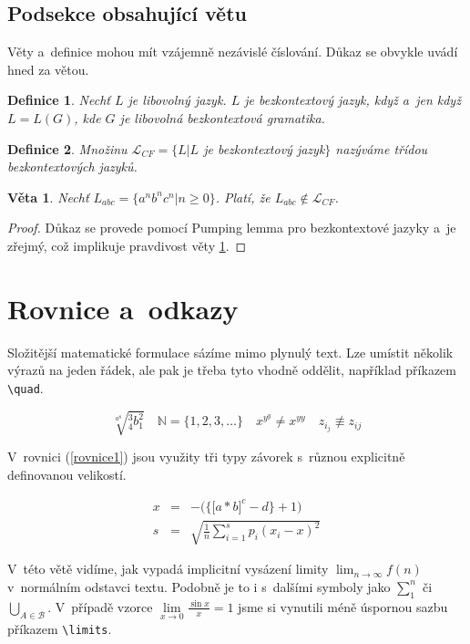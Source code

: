 \documentclass[11pt,a4paper,twocolumn]{article}
\newtheorem{definice}{Definice}[section]
\newtheorem{veta}{Věta}
\begin{document}
\subsection{Podsekce obsahující větu}
  Věty a~definice mohou mít vzájemně nezávislé číslování. Důkaz se obvykle uvádí hned
  za větou.

  \begin{definice}
    Nechť $L$ je libovolný jazyk. $L$ je \emph{bezkontextový jazyk}, když a~jen když
    $L = L(G)$, kde $G$ je libovolná bezkontextová gramatika.
  \end{definice}

  \begin{definice}
    Množinu $\mathcal{L}_{CF} = \{L|L$ je bezkontextový jazyk$\}$ nazýváme \emph{třídou
    bezkontextových jazyků}.
  \end{definice}
  \begin{veta}\label{prvniveta}
    Nechť $L_{abc}=\{a^nb^nc^n|n\geq0\}$. Platí, že $L_{abc}\notin \mathcal{L}_{CF}$.
  \end{veta}
  \begin{proof}
    Důkaz se provede pomocí Pumping lemma pro bezkontextové jazyky a~je zřejmý, což
    implikuje pravdivost věty \ref{prvniveta}.
  \end{proof}

\section{Rovnice a~odkazy}
  Složitější matematické formulace sázíme mimo plynulý text. Lze umístit několik výrazů
  na jeden řádek, ale pak je třeba tyto vhodně oddělit, například příkazem \verb|\quad|.

  \[
    \sqrt[a^8]{^3_4b^2_1}          \quad
    \mathbb{N} = \{1,2,3,\ldots\}  \quad
    x^{y^y} \neq x^{yy}            \quad
    z_{i_j} \not \equiv z_{ij}
  \]

  V~rovnici (\ref{rovnice1}) jsou využity tři typy závorek s~různou explicitně definovanou
  velikostí.

  \begin{eqnarray}
    \label{rovnice1}
    x & = & -\bigg(\Big\{\big[a \ast b \big]^c - d \Big\} + 1 \bigg)              \\
    s & = & \sqrt{\frac{1}{n}\sum^s_{i=1} p_i (x_i-x)^2} \nonumber
  \end{eqnarray}

  V~této větě vidíme, jak vypadá implicitní vysázení limity $\lim_{n \rightarrow \infty}
  f(n)$ v~normálním odstavci textu. Podobně je to i s~dalšími symboly jako $\sum^n_1$ či
  $\bigcup_{A \in \mathcal{B}}$. V~případě vzorce $\lim\limits_{x \rightarrow 0}
  \frac{\sin x}{x} = 1$ jsme si vynutili méně úspornou sazbu příkazem \verb|\limits|.
\end{document}
